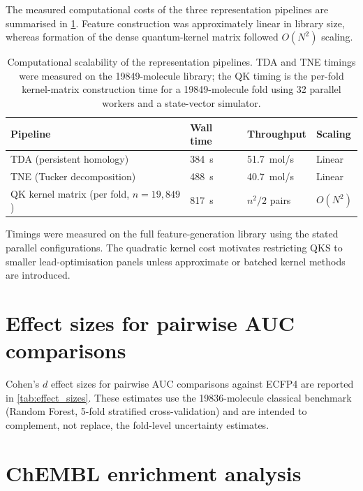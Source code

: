 \documentclass[11pt,a4paper]{article}
\begin{document}
The measured computational costs of the three representation pipelines are summarised in \cref{tab:scalability}. Feature construction was approximately linear in library size, whereas formation of the dense quantum-kernel matrix followed $O(N^2)$ scaling.

\begin{table}[htbp]
\centering
\caption{Computational scalability of the representation pipelines. TDA and TNE timings were measured on the \num{19849}-molecule library; the QK timing is the per-fold kernel-matrix construction time for a \num{19849}-molecule fold using 32 parallel workers and a state-vector simulator.}
\label{tab:scalability}
\begin{tabularx}{\textwidth}{l l l l}
\toprule
Pipeline & {Wall time} & {Throughput} & {Scaling} \\
\midrule
TDA (persistent homology) & \SI{384}{\second} & 51.7~mol/s & Linear \\
TNE (Tucker decomposition) & \SI{488}{\second} & 40.7~mol/s & Linear \\
QK kernel matrix (per fold, $n=19{,}849$) & \SI{817}{\second} & $n^2/2$ pairs & $O(N^2)$ \\
\bottomrule
\end{tabularx}
\vspace{1mm}
\footnotesize Timings were measured on the full feature-generation library using the stated parallel configurations. The quadratic kernel cost motivates restricting QKS to smaller lead-optimisation panels unless approximate or batched kernel methods are introduced.
\end{table}


\section{Effect sizes for pairwise AUC comparisons}
\label{sec:effect_sizes}

Cohen's $d$ effect sizes for pairwise AUC comparisons against ECFP4 are reported in \cref{tab:effect_sizes}. These estimates use the \num{19836}-molecule classical benchmark (Random Forest, 5-fold stratified cross-validation) and are intended to complement, not replace, the fold-level uncertainty estimates.





\section{ChEMBL enrichment analysis}
\label{sec:chembl_enrichment}
\end{document}
